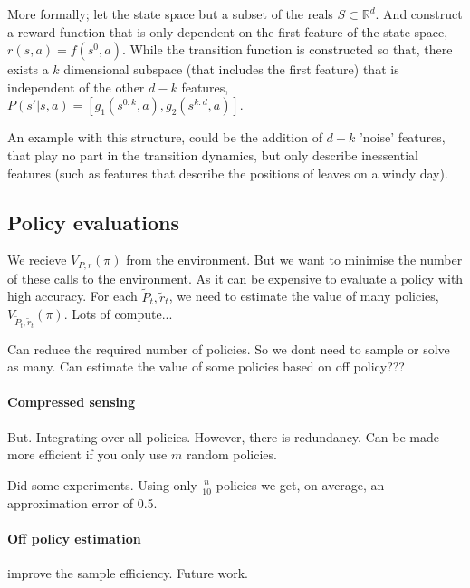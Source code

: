 More formally; let the state space but a subset of the reals $S \subset \mathbb R^d$.
And construct a reward function that is only dependent on the first feature of the state space, $r(s, a) = f(s^0, a)$.
While the transition function is constructed so that, there exists a $k$ dimensional subspace (that includes the first feature)
that is independent of the other $d-k$ features, $P(s'|s, a) = [g_1(s^{0:k}, a), g_2(s^{k:d}, a)]$.

An example with this structure, could be the addition of $d-k$ 'noise' features,
that play no part in the transition dynamics, but only describe inessential features
(such as features that describe the positions of leaves on a windy day).

%

\subsection{Policy evaluations}

We recieve $V_{P, r}(\pi)$ from the environment. But we want to minimise the number of these calls to the environment.
  As it can be expensive to evaluate a policy with high accuracy.
For each $\tilde P_t, \tilde r_t$, we need to estimate the value of many policies, $V_{\tilde P_t, \tilde r_t}(\pi)$. Lots of compute...

Can reduce the required number of policies. So we dont need to sample or solve as many.
Can estimate the value of some policies based on off policy???

\paragraph{Compressed sensing}

But. Integrating over all policies. However, there is redundancy.
Can be made more efficient if you only use $m$ random policies.

Did some experiments. Using only $\frac{n}{10}$ policies we get, on average, an approximation error of 0.5.

\paragraph{Off policy estimation} improve the sample efficiency. Future work.

